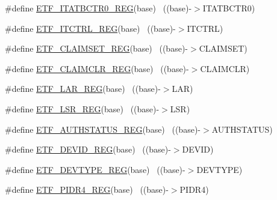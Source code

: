\begin{DoxyCompactItemize}
\item 
\#define \hyperlink{group___e_t_f___register___accessor___macros_ga6ebd31f02cbd86ae5ef2ed2df8ca432d}{E\+T\+F\+\_\+\+I\+T\+A\+T\+B\+C\+T\+R0\+\_\+\+R\+EG}(base)                                ~((base)-\/$>$I\+T\+A\+T\+B\+C\+T\+R0)
\item 
\#define \hyperlink{group___e_t_f___register___accessor___macros_ga918b6dc59d132cd28982b2db5a9da5e3}{E\+T\+F\+\_\+\+I\+T\+C\+T\+R\+L\+\_\+\+R\+EG}(base)                                      ~((base)-\/$>$I\+T\+C\+T\+RL)
\item 
\#define \hyperlink{group___e_t_f___register___accessor___macros_gaf42e2c82c7c3f8b0b92c0220651a307b}{E\+T\+F\+\_\+\+C\+L\+A\+I\+M\+S\+E\+T\+\_\+\+R\+EG}(base)                                  ~((base)-\/$>$C\+L\+A\+I\+M\+S\+ET)
\item 
\#define \hyperlink{group___e_t_f___register___accessor___macros_ga312f63051726e4353cc7327885a2944c}{E\+T\+F\+\_\+\+C\+L\+A\+I\+M\+C\+L\+R\+\_\+\+R\+EG}(base)                                  ~((base)-\/$>$C\+L\+A\+I\+M\+C\+LR)
\item 
\#define \hyperlink{group___e_t_f___register___accessor___macros_gad3ed858ce6cb420afbb17f92ccd66aa1}{E\+T\+F\+\_\+\+L\+A\+R\+\_\+\+R\+EG}(base)                                            ~((base)-\/$>$L\+AR)
\item 
\#define \hyperlink{group___e_t_f___register___accessor___macros_gab11d6e472c1d965bcf67965110dfdc3d}{E\+T\+F\+\_\+\+L\+S\+R\+\_\+\+R\+EG}(base)                                            ~((base)-\/$>$L\+SR)
\item 
\#define \hyperlink{group___e_t_f___register___accessor___macros_ga9f4398ed01d6b173c9dcb969e6188d5e}{E\+T\+F\+\_\+\+A\+U\+T\+H\+S\+T\+A\+T\+U\+S\+\_\+\+R\+EG}(base)                              ~((base)-\/$>$A\+U\+T\+H\+S\+T\+A\+T\+US)
\item 
\#define \hyperlink{group___e_t_f___register___accessor___macros_ga67993c3d2a89be881d7cf6e9376262dd}{E\+T\+F\+\_\+\+D\+E\+V\+I\+D\+\_\+\+R\+EG}(base)                                        ~((base)-\/$>$D\+E\+V\+ID)
\item 
\#define \hyperlink{group___e_t_f___register___accessor___macros_ga4a325b20038d673fb3ce3315d92447c8}{E\+T\+F\+\_\+\+D\+E\+V\+T\+Y\+P\+E\+\_\+\+R\+EG}(base)                                    ~((base)-\/$>$D\+E\+V\+T\+Y\+PE)
\item 
\#define \hyperlink{group___e_t_f___register___accessor___macros_gaa7e3cd7e6ebe630d04469253ef74edff}{E\+T\+F\+\_\+\+P\+I\+D\+R4\+\_\+\+R\+EG}(base)                                        ~((base)-\/$>$P\+I\+D\+R4)

\end{DoxyCompactItemize}
